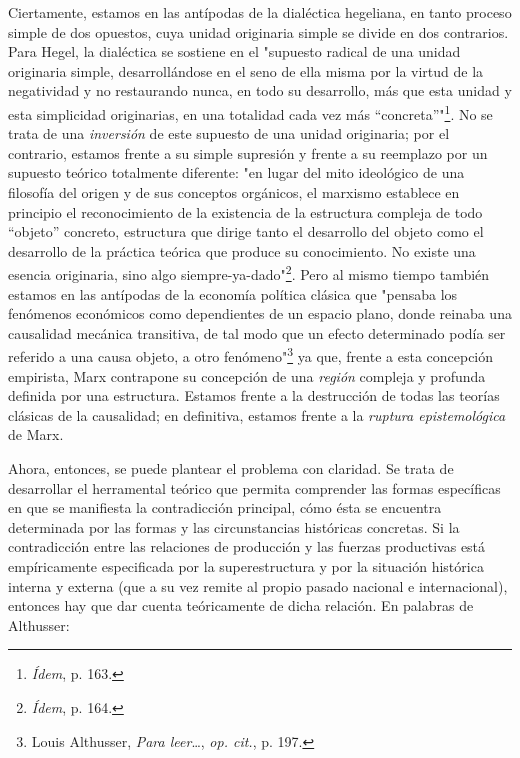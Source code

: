 \documentclass{book}
\begin{document}
Ciertamente, estamos en las antípodas de la dialéctica hegeliana, en
tanto proceso simple de dos opuestos, cuya unidad originaria simple se
divide en dos contrarios. Para Hegel, la dialéctica se sostiene en el
"supuesto radical de una unidad originaria simple, desarrollándose en el
seno de ella misma por la virtud de la negatividad y no restaurando
nunca, en todo su desarrollo, más que esta unidad y esta simplicidad
originarias, en una totalidad cada vez más ``concreta''"\footnote{\emph{Ídem},
  p. 163.}. No se trata de una \emph{inversión} de este supuesto de una
unidad originaria; por el contrario, estamos frente a su simple
supresión y frente a su reemplazo por un supuesto teórico totalmente
diferente: "en lugar del mito ideológico de una filosofía del origen y
de sus conceptos orgánicos, el marxismo establece en principio el
reconocimiento de la existencia de la estructura compleja de todo
``objeto'' concreto, estructura que dirige tanto el desarrollo del
objeto como el desarrollo de la práctica teórica que produce su
conocimiento. No existe una esencia originaria, sino algo
siempre-ya-dado"\footnote{\emph{Ídem}, p. 164.}. Pero al mismo tiempo
también estamos en las antípodas de la economía política clásica que
"pensaba los fenómenos económicos como dependientes de un espacio plano,
donde reinaba una causalidad mecánica transitiva, de tal modo que un
efecto determinado podía ser referido a una causa objeto, a otro
fenómeno"\footnote{Louis Althusser, \emph{Para leer}\ldots, \emph{op.
  cit.}, p. 197.} ya que, frente a esta concepción empirista, Marx
contrapone su concepción de una \emph{región} compleja y profunda
definida por una estructura. Estamos frente a la destrucción de todas
las teorías clásicas de la causalidad; en definitiva, estamos frente a
la \emph{ruptura epistemológica} de Marx.

Ahora, entonces, se puede plantear el problema con claridad. Se trata de
desarrollar el herramental teórico que permita comprender las formas
específicas en que se manifiesta la contradicción principal, cómo ésta
se encuentra determinada por las formas y las circunstancias históricas
concretas. Si la contradicción entre las relaciones de producción y las
fuerzas productivas está empíricamente especificada por la
superestructura y por la situación histórica interna y externa (que a su
vez remite al propio pasado nacional e internacional), entonces hay que
dar cuenta teóricamente de dicha relación. En palabras de Althusser:
\end{document}
